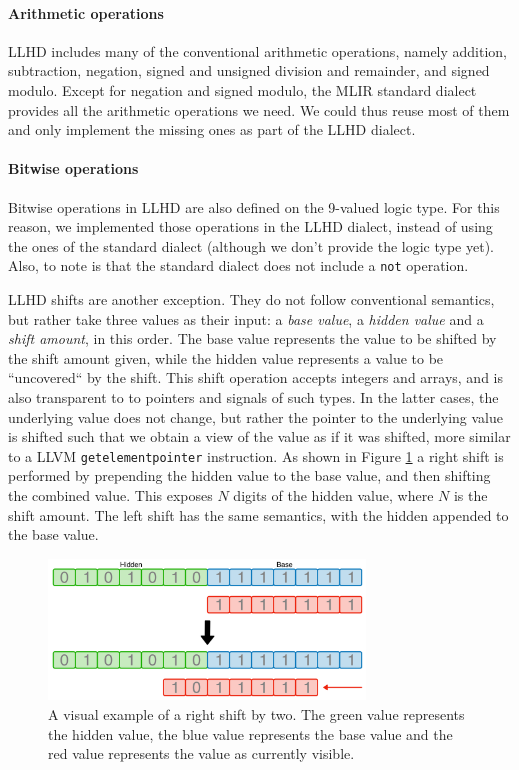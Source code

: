 \paragraph{Arithmetic operations}
LLHD includes many of the conventional arithmetic operations, namely addition, subtraction, negation, signed and unsigned division and remainder, and signed modulo. Except for negation and signed modulo, the MLIR standard dialect provides all the arithmetic operations we need. We could thus reuse most of them and only implement the missing ones as part of the LLHD dialect.

\paragraph{Bitwise operations}
Bitwise operations in LLHD are also defined on the 9-valued logic type. For this reason, we implemented those operations in the LLHD dialect, instead of using the ones of the standard dialect (although we don't provide the logic type yet). Also, to note is that the standard dialect does not include a \texttt{not} operation.

LLHD shifts are another exception. They do not follow conventional semantics, but rather take three values as their input: a \textit{base value}, a \textit{hidden value} and a \textit{shift amount}, in this order. The base value represents the value to be shifted by the shift amount given, while the hidden value represents a value to be “uncovered“ by the shift. This shift operation accepts integers and arrays, and is also transparent to to pointers and signals of such types. In the latter cases, the underlying value does not change, but rather the pointer to the underlying value is shifted such that we obtain a view of the value as if it was shifted, more similar to a LLVM \texttt{getelementpointer} instruction. As shown in Figure \ref{fig:shr} a right shift is performed by prepending the hidden value to the base value, and then shifting the combined value. This exposes $N$ digits of the hidden value, where $N$ is the shift amount. The left shift has the same semantics, with the hidden appended to the base value.

\begin{figure}[ht]
    \centering
    \includegraphics[width=0.75\textwidth]{gfx/ShiftRight.png}
    \caption[A visual example of a right shift.]{A visual example of a right shift by two. The green value represents the hidden value, the blue value represents the base value and the red value represents the value as currently visible.}
    \label{fig:shr}
\end{figure}

